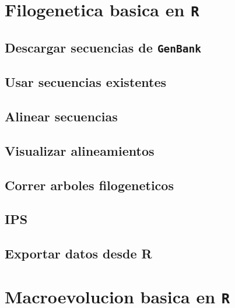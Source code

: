 \documentclass[
]{book}
\begin{document}
\hypertarget{filogenetica-basica-en-r}{%
\chapter{\texorpdfstring{Filogenetica basica en \texttt{R}}{Filogenetica basica en R}}\label{filogenetica-basica-en-r}}

\hypertarget{descargar-secuencias-de-genbank}{%
\section{\texorpdfstring{Descargar secuencias de \texttt{GenBank}}{Descargar secuencias de GenBank}}\label{descargar-secuencias-de-genbank}}

\hypertarget{usar-secuencias-existentes}{%
\section{Usar secuencias existentes}\label{usar-secuencias-existentes}}

\hypertarget{alinear-secuencias}{%
\section{Alinear secuencias}\label{alinear-secuencias}}

\hypertarget{visualizar-alineamientos}{%
\section{Visualizar alineamientos}\label{visualizar-alineamientos}}

\hypertarget{correr-arboles-filogeneticos}{%
\section{Correr arboles filogeneticos}\label{correr-arboles-filogeneticos}}

\hypertarget{ips}{%
\section{IPS}\label{ips}}

\hypertarget{exportar-datos-desde-r}{%
\section{Exportar datos desde R}\label{exportar-datos-desde-r}}

\hypertarget{macroevolucion-basica-en-r}{%
\chapter{\texorpdfstring{Macroevolucion basica en \texttt{R}}{Macroevolucion basica en R}}\label{macroevolucion-basica-en-r}}
\end{document}
